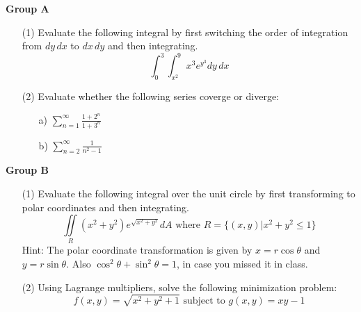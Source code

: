 \documentclass[12pt, amssymb, one column]{article}
\begin{document}
\noindent \textbf{\large{Group A}}

\begin{itemize}
	\item[(1)]  Evaluate the following integral by first switching the order of integration from $dy\,dx$ to $dx \, dy$ and then integrating.
	$$\int_0^3 \int_{x^2}^9 x^3 e^{y^3} dy\,dx$$	
	\item[(2)] Evaluate whether the following series coverge or diverge:
	\begin{itemize}
		\item[a)] $\sum_{n=1}^{\infty} \frac{1+2^n}{1+3^n}$
		\item[b)] $\sum_{n=2}^{\infty} \frac{1}{n^2-1}$
	\end{itemize}
\end{itemize}



\pagebreak


\noindent \textbf{\large{Group B}}
\begin{itemize}
	\item[(1)] Evaluate the following integral over the unit circle by first transforming to polar coordinates and then integrating.
	$$\iint\limits_{R} (x^2+y^2)e^{\sqrt{x^2+y^2}} dA \mbox{ where } R=\{(x,y)| x^2+y^2 \leq 1\}$$
	Hint: The polar coordinate transformation is given by $x=r\cos \theta$ and $y= r\sin \theta$. Also $\cos^2\theta + \sin^2 \theta = 1$, in case you missed it in class.
	\item[(2)] Using Lagrange multipliers, solve the following minimization problem:
	$$f(x,y) = \sqrt{x^2+y^2+1} \mbox{ subject to } g(x,y)= xy-1$$
\end{itemize} 
\end{document}
